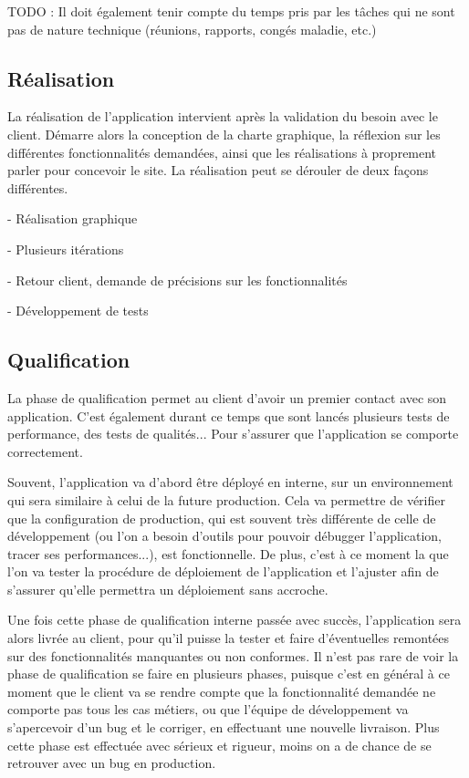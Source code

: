 TODO : Il doit également tenir compte du temps pris par les tâches qui ne sont pas de nature technique (réunions, rapports, congés maladie, etc.) 


\subsection{Réalisation}

La réalisation de l'application intervient après la validation du besoin avec le client. Démarre alors la conception de la charte graphique, la réflexion sur les différentes fonctionnalités demandées, ainsi que les réalisations à proprement parler pour concevoir le site. La réalisation peut se dérouler de deux façons différentes.

- Réalisation graphique

- Plusieurs itérations

- Retour client, demande de précisions sur les fonctionnalités

- Développement de tests


\subsection{Qualification}

La phase de qualification permet au client d'avoir un premier contact avec son application. C'est également durant ce temps que sont lancés plusieurs tests de performance, des tests de qualités... Pour s'assurer que l'application se comporte correctement.

Souvent, l'application va d'abord être déployé en interne, sur un environnement qui sera similaire à celui de la future production. Cela va permettre de vérifier que la configuration de production, qui est souvent très différente de celle de développement (ou l'on a besoin d'outils pour pouvoir débugger l'application, tracer ses performances...), est fonctionnelle. De plus, c'est à ce moment la que l'on va tester la procédure de déploiement de l'application et l'ajuster afin de s'assurer qu'elle permettra un déploiement sans accroche.

Une fois cette phase de qualification interne passée avec succès, l'application sera alors livrée au client, pour qu'il puisse la tester et faire d'éventuelles remontées sur des fonctionnalités manquantes ou non conformes. Il n'est pas rare de voir la phase de qualification se faire en plusieurs phases, puisque c'est en général à ce moment que le client va se rendre compte que la fonctionnalité demandée ne comporte pas tous les cas métiers, ou que l'équipe de développement va s'apercevoir d'un bug et le corriger, en effectuant une nouvelle livraison. Plus cette phase est effectuée avec sérieux et rigueur, moins on a de chance de se retrouver avec un bug en production. 

